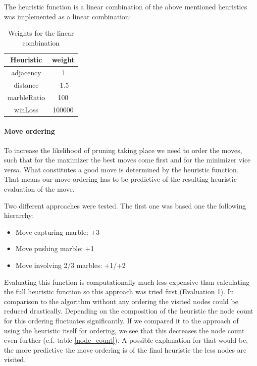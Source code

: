 \documentclass{llncs}
\begin{document}
The heuristic function is a linear combination of the above mentioned heuristics was implemented as a linear combination:

\begin{table}
	\begin{center}
		\begin{tabular}{ | c | c | }
			\hline
			Heuristic   & weight \\
			\hline
			adjacency   & 1      \\
			\hline
			distance    & -1.5   \\
			\hline
			marbleRatio & 100    \\
			\hline
			winLoss     & 100000 \\
			\hline
		\end{tabular}
	\end{center}
	\caption{Weights for the linear combination}
	\label{heuristic_table}
\end{table}
\paragraph{Move ordering}
To increase the likelihood of pruning taking place we need to order the moves, such that for the maximizer the best moves come first and for the minimizer vice versa. What constitutes a good move is determined by the heuristic function. That means our move ordering has to be predictive of the resulting heuristic evaluation of the move.

Two different approaches were tested. The first one was based one the following hierarchy:

\begin{itemize}
	\item Move capturing marble: +3
	\item Move pushing marble: +1
	\item Move involving 2/3 marbles: +1/+2
\end{itemize}

Evaluating this function is computationally much less expensive than calculating the full heuristic function so this approach was tried first (Evaluation 1). In comparison to the algorithm without any ordering the visited nodes could be reduced drastically. Depending on the composition of the heuristic the node count for this ordering fluctuates significantly. If we compared it to the approach of using the heuristic itself for ordering, we see that this decreases the node count even further (c.f. table \ref{node_count}). A possible explanation for that would be, the more predictive the move ordering is of the final heuristic the less nodes are visited.
\end{document}

